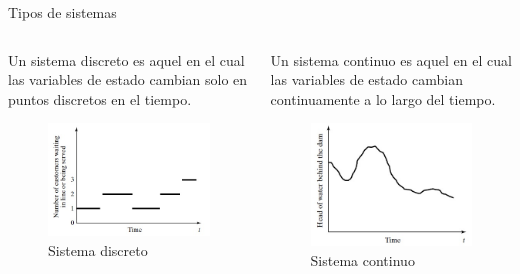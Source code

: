 \begin{frame}{Tipos de sistemas}
\begin{columns}
\begin{column}{0.5\textwidth}
    Un sistema discreto es aquel en el cual las variables de estado cambian solo en puntos discretos en el tiempo.
\begin{figure}
    \centering
    \includegraphics[width=4.5cm]{images/discreto.jpg}
    \caption{Sistema discreto}
    \label{fig:sistdiscreto}
\end{figure}
\end{column}
\begin{column}{0.5\textwidth} 
    Un sistema continuo es aquel en el cual las variables de estado cambian continuamente a lo largo del tiempo.
\begin{figure}
    \centering
    \includegraphics[width=4.5cm]{images/continuo.jpg}
    \caption{Sistema continuo}
    \label{fig:sistcontinuo}
\end{figure}
\end{column}
\end{columns}
\end{frame}




